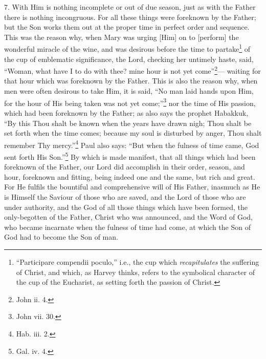 7. With Him is nothing incomplete or out of due season, just as with the Father there is nothing incongruous. For all these things were foreknown by the Father; but the Son works them out at the proper time in perfect order and sequence. This was the reason why, when Mary was urging [Him] on to [perform] the wonderful miracle of the wine, and was desirous before the time to partake\footnote{“Participare compendii poculo,” i.e., the cup which \emph{recapitulates} the suffering of Christ, and which, as Harvey thinks, refers to the symbolical character of the cup of the Eucharist, as setting forth the passion of Christ.} of the cup of emblematic significance, the Lord, checking her untimely haste, said, “Woman, what have I to do with thee? mine hour is not yet come”\footnote{John ii. 4.}— waiting for that hour which was foreknown by the Father. This is also the reason why, when men were often desirous to take Him, it is said, “No man laid hands upon Him, for the hour of His being taken was not yet come;”\footnote{John vii. 30.} nor the time of His passion, which had been foreknown by the Father; as also says the prophet Habakkuk, “By this Thou shalt be known when the years have drawn nigh; Thou shalt be set forth when the time comes; because my soul is disturbed by anger, Thou shalt remember Thy mercy.”\footnote{Hab. iii. 2.} Paul also says: “But when the fulness of time came, God sent forth His Son.”\footnote{Gal. iv. 4.} By which is made manifest, that all things which had been foreknown of the Father, our Lord did accomplish in their order, season, and hour, foreknown and fitting, being indeed one and the same, but rich and great. For He fulfils the bountiful and comprehensive will of His Father, inasmuch as He is Himself the Saviour of those who are saved, and the Lord of those who are under authority, and the God of all those things which have been formed, the only-begotten of the Father, Christ who was announced, and the Word of God, who became incarnate when the fulness of time had come, at which the Son of God had to become the Son of man.

